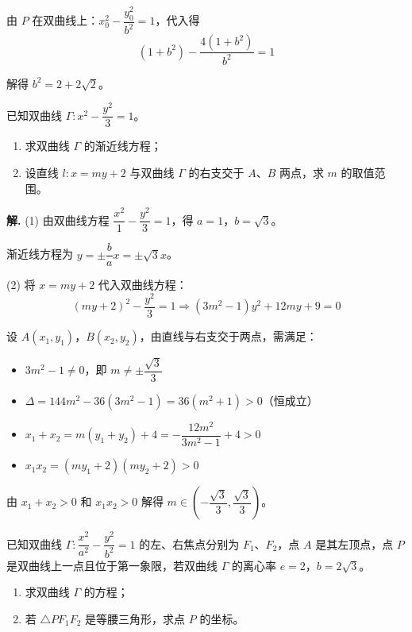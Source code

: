 \documentclass[11pt]{ctexrep}
\begin{document}
由 $P$ 在双曲线上：$x_0^2 - \dfrac{y_0^2}{b^2} = 1$，代入得
\[
    (1+b^2) - \frac{4(1+b^2)}{b^2} = 1
\]

解得 $b^2 = 2 + 2\sqrt{2}$。

\begin{example}[双曲线的渐近线问题]
    已知双曲线 $\Gamma: x^2 - \dfrac{y^2}{3} = 1$。
    \begin{enumerate}
        \item 求双曲线 $\Gamma$ 的渐近线方程；
        \item 设直线 $l: x = my + 2$ 与双曲线 $\Gamma$ 的右支交于 $A$、$B$ 两点，求 $m$ 的取值范围。
    \end{enumerate}
\end{example}

\textbf{解.} (1) 由双曲线方程 $\dfrac{x^2}{1} - \dfrac{y^2}{3} = 1$，得 $a = 1$，$b = \sqrt{3}$。

渐近线方程为 $y = \pm \dfrac{b}{a}x = \pm \sqrt{3}x$。

(2) 将 $x = my + 2$ 代入双曲线方程：
\[
    (my + 2)^2 - \frac{y^2}{3} = 1 \Rightarrow (3m^2 - 1)y^2 + 12my + 9 = 0
\]

设 $A(x_1, y_1)$，$B(x_2, y_2)$，由直线与右支交于两点，需满足：
\begin{itemize}
    \item $3m^2 - 1 \neq 0$，即 $m \neq \pm \dfrac{\sqrt{3}}{3}$
    \item $\Delta = 144m^2 - 36(3m^2 - 1) = 36(m^2 + 1) > 0$（恒成立）
    \item $x_1 + x_2 = m(y_1 + y_2) + 4 = -\dfrac{12m^2}{3m^2-1} + 4 > 0$
    \item $x_1x_2 = (my_1 + 2)(my_2 + 2) > 0$
\end{itemize}

由 $x_1 + x_2 > 0$ 和 $x_1x_2 > 0$ 解得 $m \in \left(-\dfrac{\sqrt{3}}{3}, \dfrac{\sqrt{3}}{3}\right)$。

\begin{realexam}[2025届上海二模]
    已知双曲线 $\Gamma: \dfrac{x^2}{a^2} - \dfrac{y^2}{b^2} = 1$ 的左、右焦点分别为 $F_1$、$F_2$，点 $A$ 是其左顶点，点 $P$ 是双曲线上一点且位于第一象限，若双曲线 $\Gamma$ 的离心率 $e = 2$，$b = 2\sqrt{3}$。
    \begin{enumerate}
        \item 求双曲线 $\Gamma$ 的方程；
        \item 若 $\triangle PF_1F_2$ 是等腰三角形，求点 $P$ 的坐标。
    \end{enumerate}
\end{realexam}
\end{document}
